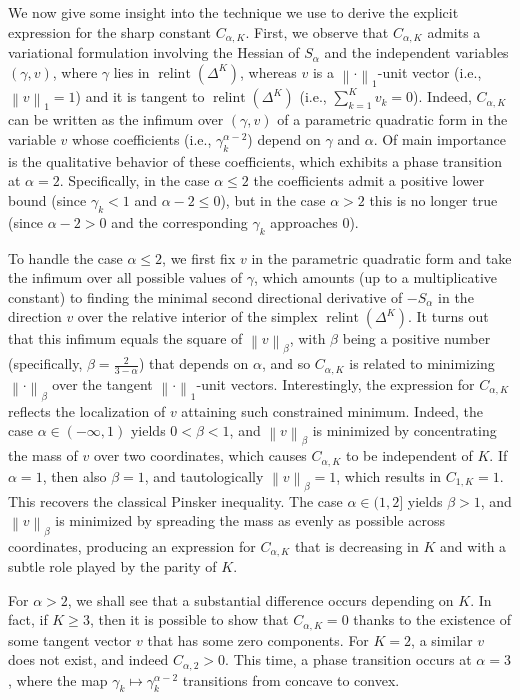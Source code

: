 \documentclass[11pt,oneside,a4paper]{article}
\newcommand{\lrb}[1]{\left(#1\right)}
\newcommand{\lno}[1]{\left\lVert#1\right\rVert}
\theoremstyle{plain}
\theoremstyle{definition}
\theoremstyle{remark}
\newcommand{\simplex}[1]{\Delta^{#1}}
\DeclareMathOperator*{\relint}{relint}
\begin{document}
We now give some insight into the technique we use to derive the explicit expression for the sharp constant $C_{\alpha,K}$.
First, we observe that $C_{\alpha,K}$ admits a variational formulation involving the Hessian
of $S_{\alpha}$ and the independent variables $(\gamma, v)$, where $\gamma$ lies in $\relint{\lrb{\simplex{K}}}$, whereas $v$ is a $\lno{\cdot}_1$-unit vector (i.e., $\lno{v}_1 = 1$) and it is tangent to $\relint{\lrb{\simplex{K}}}$ (i.e., $\sum_{k=1}^K v_k = 0$).
Indeed, $C_{\alpha,K}$ can be written as the infimum over $(\gamma, v)$ of a parametric quadratic form in the variable $v$ whose coefficients (i.e.,  $\gamma_k^{\alpha-2}$) depend on $\gamma$ and $\alpha$.
Of main importance is the qualitative behavior of these coefficients, which exhibits a phase transition at $\alpha = 2$.
Specifically, in the case $\alpha \le 2$ the coefficients admit a positive lower bound (since $\gamma_k < 1$ and $\alpha - 2 \le 0$), but in the case $\alpha > 2$ this is no longer true (since $\alpha-2>0$ and the corresponding $\gamma_k$ approaches $0$).

To handle the case $\alpha \le 2$, we first fix $v$ in the parametric quadratic form and take the infimum over all possible values of $\gamma$, which amounts (up to a multiplicative constant) to finding the minimal second directional derivative of $-S_{\alpha}$ in the direction $v$ over the relative interior of the simplex $\relint\lrb{\simplex{K}}$.
It turns out that this infimum equals the square of $\lno{v}_{\beta}$, with $\beta$ being a positive number (specifically, $\beta = \tfrac{2}{3-\alpha}$) that depends on $\alpha$,
and so $C_{\alpha, K}$ is related to minimizing $\lno{\cdot}_{\beta}$ over the tangent $\lno{\cdot}_1$-unit vectors. 
Interestingly, the expression for $C_{\alpha, K}$ reflects the localization of $v$ attaining such constrained minimum. 
Indeed, the case $\alpha \in (-\infty,1)$ yields $0 < \beta < 1$, and $\lno{v}_{\beta}$ is minimized by concentrating the mass of $v$ over two coordinates, which causes $C_{\alpha, K}$ to be independent of $K$.
If $\alpha = 1$, then also $\beta = 1$, and tautologically $\lno{v}_{\beta}= 1$, which results in $C_{1, K} = 1$. This recovers the classical Pinsker inequality.
The case $\alpha \in (1,2]$ yields $\beta > 1$, and $\lno{v}_{\beta}$ is minimized by spreading the mass as evenly as possible across coordinates, producing an expression for $C_{\alpha, K}$ that is decreasing in $K$ and with a subtle role played by the parity of $K$.

For $\alpha > 2$, we shall see that a substantial difference occurs depending on $K$.
In fact, if $K\ge 3$, then it is possible to show that $C_{\alpha, K} = 0$ thanks to the existence of some tangent vector $v$ that has some zero components.
For $K = 2$, a similar $v$ does not exist, and indeed $C_{\alpha, 2}> 0$. This time, a phase transition occurs at $\alpha = 3$, where the map $\gamma_k \mapsto\gamma_k^{\alpha-2}$ transitions from concave to convex.
\end{document}
